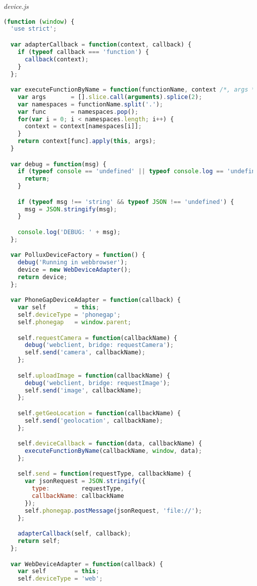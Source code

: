 \emph{device.js}
\begin{lstlisting}[language=JavaScript]
(function (window) {
  'use strict';

  var adapterCallback = function(context, callback) {
    if (typeof callback === 'function') {
      callback(context);
    }
  };

  var executeFunctionByName = function(functionName, context /*, args */) {
    var args       = [].slice.call(arguments).splice(2);
    var namespaces = functionName.split('.');
    var func       = namespaces.pop();
    for(var i = 0; i < namespaces.length; i++) {
      context = context[namespaces[i]];
    }
    return context[func].apply(this, args);
  }

  var debug = function(msg) {
    if (typeof console == 'undefined' || typeof console.log == 'undefined') {
      return;
    }

    if (typeof msg !== 'string' && typeof JSON !== 'undefined') {
      msg = JSON.stringify(msg);
    }

    console.log('DEBUG: ' + msg);
  };

  var PolluxDeviceFactory = function() {
    debug('Running in webbrowser');
    device = new WebDeviceAdapter();
    return device;
  };

  var PhoneGapDeviceAdapter = function(callback) {
    var self        = this;
    self.deviceType = 'phonegap';
    self.phonegap   = window.parent;

    self.requestCamera = function(callbackName) {
      debug('webclient, bridge: requestCamera');
      self.send('camera', callbackName);
    };

    self.uploadImage = function(callbackName) {
      debug('webclient, bridge: requestImage');
      self.send('image', callbackName);
    };

    self.getGeoLocation = function(callbackName) {
      self.send('geolocation', callbackName);
    };

    self.deviceCallback = function(data, callbackName) {
      executeFunctionByName(callbackName, window, data);
    };

    self.send = function(requestType, callbackName) {
      var jsonRequest = JSON.stringify({
        type:         requestType,
        callbackName: callbackName
      });
      self.phonegap.postMessage(jsonRequest, 'file://');
    };

    adapterCallback(self, callback);
    return self;
  };

  var WebDeviceAdapter = function(callback) {
    var self        = this;
    self.deviceType = 'web';


\end{lstlisting}
